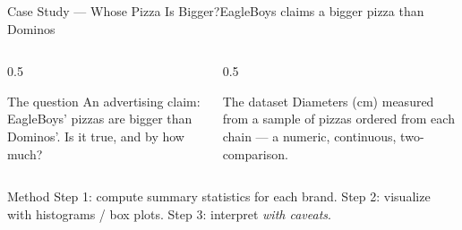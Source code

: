 \documentclass[aspectratio=169,11pt]{beamer}
\begin{document}
\begin{frame}{Case Study — Whose Pizza Is Bigger?}{EagleBoys claims a bigger pizza than Dominos}
  \begin{columns}[T]
    \begin{column}{0.5\textwidth}
      \begin{block}{The question}
        \small An advertising claim: EagleBoys' pizzas are bigger than
        Dominos'. Is it true, and by how much?
      \end{block}
    \end{column}
    \begin{column}{0.5\textwidth}
      \begin{exampleblock}{The dataset}
        \small Diameters (cm) measured from a sample of pizzas ordered from
        each chain — a numeric, continuous, two- comparison.
      \end{exampleblock}
    \end{column}
  \end{columns}
  \vfill
  \begin{alertblock}{Method}
    \small Step 1: compute summary statistics for each brand. Step 2:
    visualize with histograms / box plots. Step 3: interpret \emph{with
    caveats}.
  \end{alertblock}
\end{frame}
\end{document}
